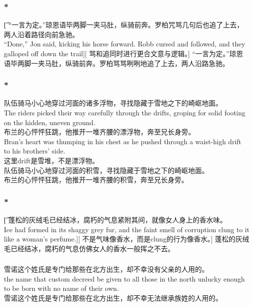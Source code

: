 \documentclass[12pt,a4paper]{article}
\begin{document}
\subsubsection{\color{red}*}\t[	
	“一言为定。”琼恩语毕两脚一夹马肚，纵骑前奔。罗柏咒骂几句后也追了上去，两人沿着路径向前急驰。\\
	“Done,” Jon said, kicking his horse forward. Robb cursed and followed, and they galloped off down the trail][
	骂和追同时进行更合文意与逻辑。]
	“一言为定。”琼恩语毕两脚一夹马肚，纵骑前奔。罗柏骂骂咧咧地追了上去，两人沿路急驰。
	
\subsubsection{\color{red}*}{\color{blue}
队伍骑马小心地穿过河面的诸多浮物，寻找隐藏于雪地之下的崎岖地面。\\
The riders picked their way carefully through the drifts, groping for solid footing on the hidden, uneven ground. \\
布兰的心怦怦狂跳，他推开一堆齐腰的漂浮物，奔至兄长身旁。\\
Bran's heart was thumping in his chest as he pushed through a waist-high drift to his brothers' side.}\\
{\color{red}这里drift是雪堆，不是漂浮物。}\\
队伍骑马小心地穿过河面的积雪，寻找隐藏于雪地之下的崎岖地面。\\
布兰的心怦怦狂跳，他推开一堆齐腰的积雪，奔至兄长身旁。
	
\subsubsection{\color{red}*}\t[		
	蓬松的灰绒毛已经结冰，腐朽的气息紧附其间，就像女人身上的香水味。\\
	Ice had formed in its shaggy grey fur, and the faint smell of corruption clung to it like a woman's perfume.][
	不是气味像香水，而是clung的行为像香水。]
	蓬松的灰绒毛已经结冰，腐朽的气息仿佛女人的香水一般挥之不去。
		
	\subsubsection{}{\color{blue}	
	雪诺这个姓氏是专门给那些在北方出生，却不幸没有父亲的人用的。\\
	the name that custom decreed be given to all those in the north unlucky enough to be born with no name of their own.}\\
	雪诺这个姓氏是专门给那些在北方出生，却不幸无法继承族姓的人用的。
			
\end{document}
